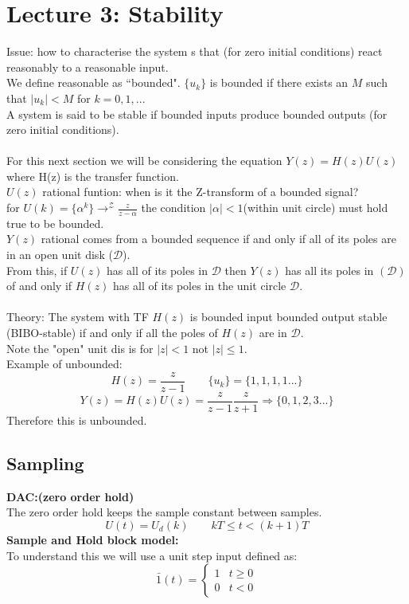 \documentclass[a4paper,11pt]{article}
\begin{document}
\section{Lecture 3: Stability}
	Issue: how to characterise the system s that (for zero initial conditions) react reasonably to a reasonable input.\\
	We define reasonable as ``bounded". $\{u_k\}$ is bounded if there exists an $M$ such that $|u_k|<M $ for $k=0,1,...$\\
	A system is said to be stable if bounded inputs produce bounded outputs (for zero initial conditions).\\\\
	For this next section we will be considering the equation $Y(z)=H(z)U(z)$ where H(z) is the transfer function.\\
	$U(z)$ rational funtion: when is it the Z-transform of a bounded signal?\\
	for $U(k)=\{\alpha^k\} \rightarrow^\mathcal{Z} \frac{z}{z-\alpha}$ the condition $|\alpha|<1$(within unit circle) must hold true to be bounded.\\
	$Y(z)$ rational comes from a bounded sequence if and only if all of its poles are in an open unit disk ($\mathcal{D}$).\\
	From this, if $U(z)$ has all of its poles in $\mathcal{D}$ then $Y(z)$ has all its poles in $(\mathcal{D})$ of and only if $H(z)$ has all of its poles in the unit circle $\mathcal{D}$.\\\\
	Theory:
	\indent The system with TF $H(z)$ is bounded input bounded output stable (BIBO-stable) if and only if all the poles of $H(z)$ are in $\mathcal{D}$.\\
	Note the "open" unit dis is for $|z|<1$ not \sout{$|z|\leq1$}.\\
	Example of unbounded:
	\begin{equation}
		H(z) = \frac{z}{z-1} \qquad \{u_k\}=\{1,1,1,1...\}
	\end{equation}
	\begin{equation}
	    	Y(z) = H(z)U(z)=\frac{z}{z-1}\frac{z}{z+1}\Rightarrow\{0,1,2,3...\}
	\end{equation}
	Therefore this is unbounded.\\
	\subsection{Sampling}
		\textbf{DAC:(zero order hold)}\\
		The zero order hold keeps the sample constant between samples. 
		\begin{equation}
			U(t)=U_d(k)\qquad kT\leq t < (k+1)T		
		\end{equation}
		\textbf{Sample and Hold block model:}\\
		To understand this we will use a unit step input defined as:
		\[\bar{1}(t) =\begin{cases} 
      			1 & t \geq 0\\
      			0 & t < 0			
   			\end{cases}
			\]
			
\end{document}
